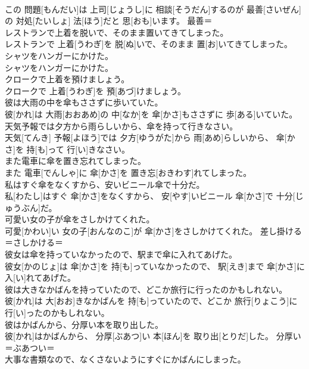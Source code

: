 \documentclass[8pt]{extreport}
\begin{document}
\begin{CJK}{UTF8}{min}
\\	この 問題[もんだい]は 上司[じょうし]に 相談[そうだん]するのが 最善[さいぜん]の 対処[たいしょ] 法[ほう]だと 思[おも]います。	最善＝ 
\\	レストランで上着を脱いで、そのまま置いてきてしまった。	
\\	レストランで 上着[うわぎ]を 脱[ぬ]いで、そのまま 置[お]いてきてしまった。	
\\	シャツをハンガーにかけた。	
\\	シャツをハンガーにかけた。	
\\	クロークで上着を預けましょう。	
\\	クロークで 上着[うわぎ]を 預[あづ]けましょう。	
\\	彼は大雨の中を傘もささずに歩いていた。	
\\	彼[かれ]は 大雨[おおあめ]の 中[なか]を 傘[かさ]もささずに 歩[ある]いていた。	
\\	天気予報では夕方から雨らしいから、傘を持って行きなさい。	
\\	天気[てんき] 予報[よほう]では 夕方[ゆうがた]から 雨[あめ]らしいから、 傘[かさ]を 持[も]って 行[い]きなさい。	
\\	また電車に傘を置き忘れてしまった。	
\\	また 電車[でんしゃ]に 傘[かさ]を 置き忘[おきわす]れてしまった。	
\\	私はすぐ傘をなくすから、安いビニール傘で十分だ。	
\\	私[わたし]はすぐ 傘[かさ]をなくすから、 安[やす]いビニール 傘[かさ]で 十分[じゅうぶん]だ。	
\\	可愛い女の子が傘をさしかけてくれた。	
\\	可愛[かわい]い 女の子[おんなのこ]が 傘[かさ]をさしかけてくれた。	差し掛ける＝さしかける＝ 
\\	彼女は傘を持っていなかったので、駅まで傘に入れてあげた。	
\\	彼女[かのじょ]は 傘[かさ]を 持[も]っていなかったので、 駅[えき]まで 傘[かさ]に 入[い]れてあげた。	
\\	彼は大きなかばんを持っていたので、どこか旅行に行ったのかもしれない。	
\\	彼[かれ]は 大[おお]きなかばんを 持[も]っていたので、どこか 旅行[りょこう]に 行[い]ったのかもしれない。	
\\	彼はかばんから、分厚い本を取り出した。	
\\	彼[かれ]はかばんから、 分厚[ぶあつ]い 本[ほん]を 取り出[とりだ]した。	分厚い＝ぶあつい＝ 
\\	大事な書類なので、なくさないようにすぐにかばんにしまった。	

\end{CJK}
\end{document}

